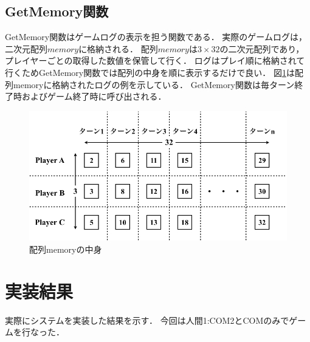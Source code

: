 \documentclass[a4paper,10pt]{jsarticle}
\begin{document}
\subsection{GetMemory関数}
GetMemory関数はゲームログの表示を担う関数である．
実際のゲームログは，二次元配列$memory$に格納される．
配列$memory$は$3\times32$の二次元配列であり，
プレイヤーごとの取得した数値を保管して行く．
ログはプレイ順に格納されて行くためGetMemory関数では配列の中身を順に表示するだけで良い．
図\ref{fig:memory}は配列memoryに格納されたログの例を示している．
GetMemory関数は毎ターン終了時およびゲーム終了時に呼び出される．
\begin{figure}
  \centering
  \includegraphics[width=120mm]{./image/memory.png}
  \caption{配列memoryの中身}
  \label{fig:memory}
\end{figure}

\section{実装結果}
実際にシステムを実装した結果を示す．
今回は人間1:COM2とCOMのみでゲームを行なった．
\end{document}
